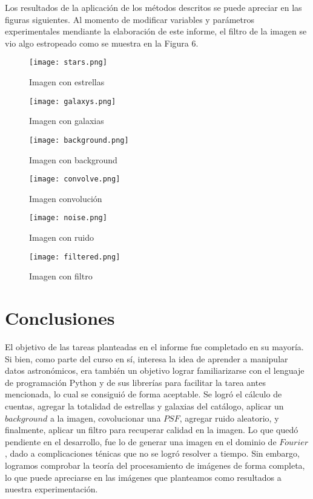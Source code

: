 \documentclass[twocolumn]{AS4201}
\begin{document}
Los resultados de la aplicación de los métodos descritos se puede apreciar en las figuras siguientes. Al momento de modificar variables y parámetros experimentales mendiante la elaboración de este informe, el filtro de la imagen se vio algo estropeado como se muestra en la Figura 6.

\begin{figure}
  \centering
    \texttt{[image: stars.png]}
  \caption{Imagen con estrellas}
  \label{fig:ejemplo}
\end{figure}

\begin{figure}
  \centering
    \texttt{[image: galaxys.png]}
  \caption{Imagen con galaxias}
  \label{fig:ejemplo}
\end{figure}

\begin{figure}
  \centering
    \texttt{[image: background.png]}
  \caption{Imagen con background}
  \label{fig:ejemplo}
\end{figure}

\begin{figure}
  \centering
    \texttt{[image: convolve.png]}
  \caption{Imagen convolución}
  \label{fig:ejemplo}
\end{figure}

\begin{figure}
  \centering
    \texttt{[image: noise.png]}
  \caption{Imagen con ruido}
  \label{fig:ejemplo}
\end{figure}

\begin{figure}
  \centering
    \texttt{[image: filtered.png]}
  \caption{Imagen con filtro}
  \label{fig:ejemplo6}
\end{figure}

\section{Conclusiones}
El objetivo de las tareas planteadas en el informe fue completado en su mayoría. Si bien, como parte del curso en sí, interesa la idea de aprender a manipular datos astronómicos, era también un objetivo lograr familiarizarse con el lenguaje de programación Python y de sus librerías para facilitar la tarea antes mencionada, lo cual se consiguió de forma aceptable. Se logró el cálculo de cuentas, agregar la totalidad de estrellas y galaxias del catálogo, aplicar un $background$ a la imagen, covolucionar una $PSF$, agregar ruido aleatorio, y finalmente, aplicar un filtro para recuperar calidad en la imagen. Lo que quedó pendiente en el desarrollo, fue lo de generar una imagen en el dominio de $Fourier$, dado a complicaciones ténicas que no se logró resolver a tiempo. Sin embargo, logramos comprobar la teoría del procesamiento de imágenes de forma completa, lo que puede apreciarse en las imágenes que planteamos como resultados a nuestra experimentación.
\end{document}
